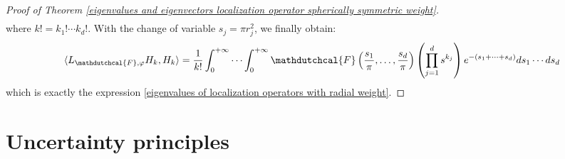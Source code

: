 \documentclass[corpo=11pt, stile=classica, tipotesi=custom,
greek, evenboxes, english]{toptesi}
\numberwithin{equation}{chapter}
\theoremstyle{remark}
\begin{document}
\begin{proof}[Proof of Theorem \ref{eigenvalues and eigenvectors localization operator spherically symmetric weight}]
\begin{align*}
	\end{align*}
	where $k! = k_1! \cdots k_d!$. With the change of variable $s_j = \pi r_j^2$, we finally obtain:
	\begin{equation*}
		\langle  L_{\mathdutchcal{F},\varphi}H_k,H_k\rangle = \dfrac{1}{k!} \int_0^{+\infty} \cdots \int_0^{+\infty} \mathdutchcal{F}\left(\frac{s_1}{\pi},\ldots,\frac{s_d}{\pi}\right) \left(\prod_{j=1}^{d} s^{k_j} \right) e^{-(s_1 + \cdots + s_d)} ds_1 \cdots ds_d
	\end{equation*}
	which is exactly the expression \eqref{eigenvalues of localization operators with radial weight}.
\end{proof}





\chapter{Uncertainty principles}\label{chapter uncertainty principles}
\end{document}
